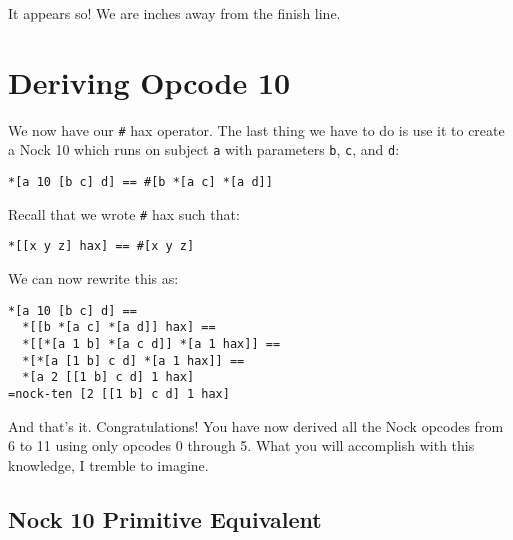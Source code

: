 \documentclass[twoside]{article}
\begin{document}
It appears so! We are inches away from the finish line.

\section{Deriving Opcode 10}

We now have our \lstinline[style=inlinecode]{#} hax operator. The last thing we have to do is use it to create a Nock 10 which runs on subject \lstinline[style=inlinecode]{a} with parameters \lstinline[style=inlinecode]{b}, \lstinline[style=inlinecode]{c}, and \lstinline[style=inlinecode]{d}:

\begin{lstlisting}[style=listingcode]
*[a 10 [b c] d] == #[b *[a c] *[a d]]
\end{lstlisting}

\noindent
Recall that we wrote \lstinline[style=inlinecode]{#} hax such that:

\begin{lstlisting}[style=listingblock]
*[[x y z] hax] == #[x y z]
\end{lstlisting}

\noindent
We can now rewrite this as:

\begin{lstlisting}[style=listingblock]
*[a 10 [b c] d] ==
  *[[b *[a c] *[a d]] hax] ==
  *[[*[a 1 b] *[a c d]] *[a 1 hax]] ==
  *[*[a [1 b] c d] *[a 1 hax]] ==
  *[a 2 [[1 b] c d] 1 hax]
=nock-ten [2 [[1 b] c d] 1 hax]
\end{lstlisting}

\noindent
And that's it. Congratulations! You have now derived all the Nock opcodes from 6 to 11 using only opcodes 0 through 5. What you will accomplish with this knowledge, I tremble to imagine.

\newpage
\subsection*{Nock 10 Primitive Equivalent}
\end{document}
